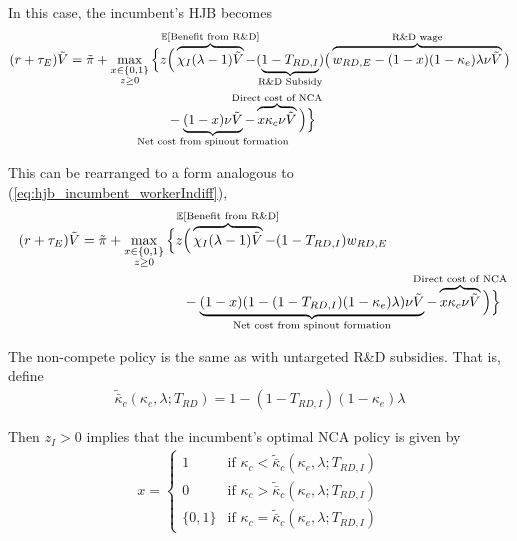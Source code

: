 \documentclass[11pt,english]{article}
\theoremstyle{remark}
\begin{document}
In this case, the incumbent's HJB becomes
\begin{align}
(r + \tau_E) \tilde{V} = \tilde{\pi} + \max_{\substack{x \in \{0,1\} \\ z \ge 0}} \Big\{z &\Big( \overbrace{\chi_I (\lambda - 1) \tilde{V}}^{\mathclap{\mathbb{E}[\textrm{Benefit from R\&D}]}}- (\underbrace{1-T_{RD,I}}_{\mathclap{\text{R\&D Subsidy}}}) \big( \overbrace{w_{RD,E} - (1-x)(1-\kappa_e)\lambda \nu \tilde{V}}^{\mathclap{\text{R\&D wage}}}\big) \label{eq:hjb_incumbent_RDsubsidyTargeted} \nonumber \\ 
&-  \underbrace{(1-x) \nu \tilde{V}}_{\mathclap{\text{Net cost from spinout formation}}} - \overbrace{x \kappa_{c} \nu \tilde{V}}^{\mathclap{\text{Direct cost of NCA}}}\Big) \Big\} 
\end{align}

This can be rearranged to a form analogous to (\ref{eq:hjb_incumbent_workerIndiff}),
\begin{align}
(r + \tau_E) \tilde{V} = \tilde{\pi} + \max_{\substack{x \in \{0,1\} \\ z \ge 0}} \Big\{z &\Big( \overbrace{\chi_I (\lambda - 1) \tilde{V}}^{\mathclap{\mathbb{E}[\textrm{Benefit from R\&D}]}}- (1-T_{RD,I}) w_{RD,E} \\
&-  \underbrace{(1-x)(1 - (1-T_{RD,I})(1-\kappa_{e})\lambda)\nu \tilde{V}}_{\mathclap{\text{Net cost from spinout formation}}} - \overbrace{x \kappa_{c} \nu \tilde{V}}^{\mathclap{\text{Direct cost of NCA}}}\Big) \Big\} \label{eq:hjb_incumbent_RDsubsidyTargeted_2}
\end{align}

The non-compete policy is the same as with untargeted R\&D subsidies. That is, define
\begin{align}
\tilde{\bar{\kappa}}_c(\kappa_e,\lambda;T_{RD}) = 1 - (1-T_{RD,I})(1-\kappa_e)\lambda
\end{align} 

Then $z_I > 0$ implies that the incumbent's optimal NCA policy is given by 
\begin{align}
x = \begin{cases}
1 & \textrm{if } \kappa_{c} < \tilde{\bar{\kappa}}_c (\kappa_e, \lambda;T_{RD,I}) \\
0 & \textrm{if } \kappa_{c} > \tilde{\bar{\kappa}}_c (\kappa_e, \lambda;T_{RD,I})\\
\{0,1\} & \textrm{if } \kappa_c = \tilde{\bar{\kappa}}_c (\kappa_e, \lambda;T_{RD,I})
\end{cases} \label{eq:nca_policy_RDsubsidyTargeted}
\end{align}
\end{document}

